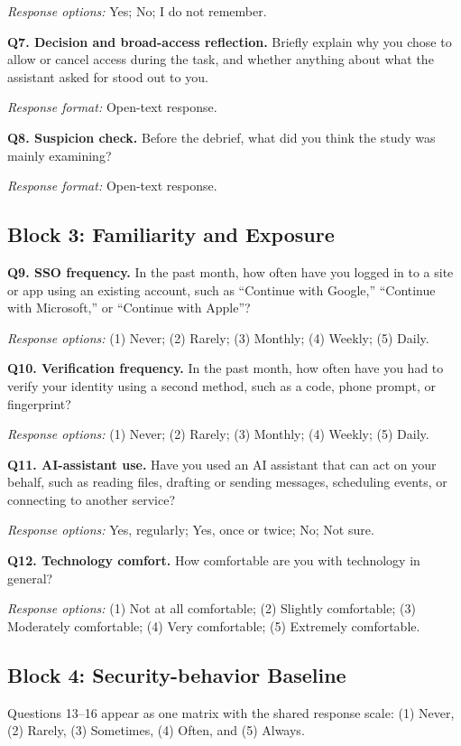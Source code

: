 \documentclass[11pt]{article}
\begin{document}
\textit{Response options:} Yes; No; I do not remember.

\textbf{Q7. Decision and broad-access reflection.}
Briefly explain why you chose to allow or cancel access during the task, and
whether anything about what the assistant asked for stood out to you.

\textit{Response format:} Open-text response.

\textbf{Q8. Suspicion check.}
Before the debrief, what did you think the study was mainly examining?

\textit{Response format:} Open-text response.

\subsection*{Block 3: Familiarity and Exposure}

\textbf{Q9. SSO frequency.}
In the past month, how often have you logged in to a site or app using an
existing account, such as ``Continue with Google,'' ``Continue with
Microsoft,'' or ``Continue with Apple''?

\textit{Response options:} (1) Never; (2) Rarely; (3) Monthly; (4) Weekly;
(5) Daily.

\textbf{Q10. Verification frequency.}
In the past month, how often have you had to verify your identity using a
second method, such as a code, phone prompt, or fingerprint?

\textit{Response options:} (1) Never; (2) Rarely; (3) Monthly; (4) Weekly;
(5) Daily.

\textbf{Q11. AI-assistant use.}
Have you used an AI assistant that can act on your behalf, such as reading
files, drafting or sending messages, scheduling events, or connecting to
another service?

\textit{Response options:} Yes, regularly; Yes, once or twice; No; Not sure.

\textbf{Q12. Technology comfort.}
How comfortable are you with technology in general?

\textit{Response options:} (1) Not at all comfortable; (2) Slightly
comfortable; (3) Moderately comfortable; (4) Very comfortable; (5) Extremely
comfortable.

\subsection*{Block 4: Security-behavior Baseline}

Questions 13--16 appear as one matrix with the shared response scale:
(1) Never, (2) Rarely, (3) Sometimes, (4) Often, and (5) Always.
\end{document}
